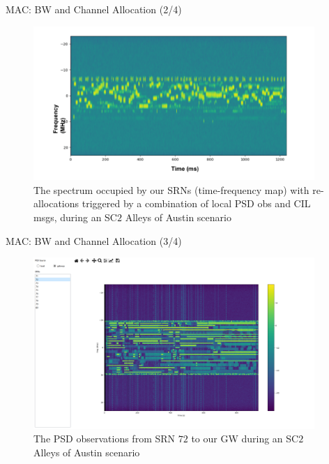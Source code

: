 \documentclass{beamer}
\begin{document}
\begin{frame}{MAC: BW and Channel Allocation (2/4)}
\begin{figure}
    \centering
    \includegraphics[width = 0.95\textwidth]{Alleys_of_Austin_Channel_Access.PNG}
    \caption{The spectrum occupied by our SRNs (time-frequency map) with re-allocations triggered by a combination of local PSD obs and CIL msgs, during an SC$2$ Alleys of Austin scenario}
    \label{fig:14}
\end{figure}
\end{frame}
\begin{frame}{MAC: BW and Channel Allocation (3/4)}
\begin{figure}
    \centering
    \includegraphics[width = 0.95\textwidth]{Alleys_PSD.PNG}
    \caption{The PSD observations from SRN $72$ to our GW during an SC$2$ Alleys of Austin scenario}
    \label{fig:15}
\end{figure}
\end{frame}
\end{document}
